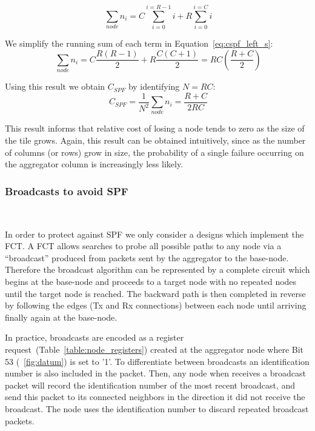 \begin{equation}~\label{eq:cspf_left_s}
  \sum_{node}n_{i} = C\sum_{i=0}^{i=R-1}i + R\sum_{i=0}^{i=C}i
\end{equation}

We simplify the running sum of each term in Equation~\ref{eq:cspf_left_s}:
\begin{equation}~\label{eq:cspf_left_e}
  \sum_{node}n_{i} = C\frac{R(R-1)}{2} + R\frac{C(C+1)}{2} = RC(\frac{R+C}{2})
\end{equation}

Using this result we obtain $C_{SPF}$ by identifying $N = RC$:
\begin{equation}~\label{eq:cspf_left_fin}
  C_{SPF} = \frac{1}{N^{2}}\sum_{node}n_{i} = \boxed{\frac{R+C}{2RC}}
\end{equation}

This result informs that relative cost of losing a node tends to zero as the size of the tile grows.
Again, this result can be obtained intuitively, since as the number of columns (or rows) grow in size, the probability of a single failure occurring on the aggregator column is increasingly less likely.

\subsubsection{Broadcasts to avoid SPF}~\label{sec:broadcast}

In order to protect against SPF we only consider a designs which implement the FCT.
A FCT allows searches to probe all possible paths to any node via a ``broadcast'' produced from packets sent by the aggregator to the base-node.
Therefore the broadcast algorithm can be represented by a complete circuit which begins at the base-node and proceeds to a target node with no repeated nodes until the target node is reached.
The backward path is then completed in reverse by following the edges (Tx and Rx connections) between each node until arriving finally again at the base-node.

In practice, broadcasts are encoded as a register request~(Table~\ref{table:node_registers}) created at the aggregator node where Bit 53 (~\ref{fig:datum}) is set to '1'. 
To differentiate between broadcasts an identification number is also included in the packet.
Then, any node when receives a broadcast packet will record the identification number of the most recent broadcast, and send this packet to its connected neighbors in the direction it did not receive the broadcast.
The node uses the identification number to discard repeated broadcast packets.

